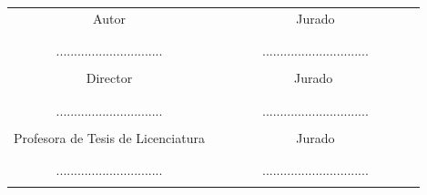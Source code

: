 \documentclass{article}
\numberwithin{figure}{section}
\begin{document}
\begin{center}
\begin{tabular}{|c|c|}
\hline
Autor &  \,\,\,\,\, \,\,\,\,\,\,\,\,\, \,\,\,\,\,\,\,\,\,\,\,\,\,\,\,\,\,\,Jurado \,\,\,\,\,\,\,\,\,\,\,\,\,\,\,\,\,\,\,\, \,\,\,\,\,\,\,\,\,\,\,\, \\
&            \\
       &            \\
  ..............................            &     ..............................          \\
       &            \\

\hline
Director &      \,\,\,\,\, \,\,\,\,\,\,\,\,\, \,\,\,\,\,\,\,\,\,\,\,\,\,\,\,\,\,\,Jurado \,\,\,\,\, \,\,\,\,\,\,\,\,\,\,\,\,\,\,\,\,\,\,\,\, \,\,\,\,\,\,\,\\
&            \\
       &            \\
  ..............................            &       ..............................        \\
         &            \\
 \hline
Profesora de Tesis de Licenciatura &  \,\,\,\,\,\,\, \,\,\,\,\, \,\,\,\,\,\,\,\,\,\,\,\,\,\,\,\,\,\,\,\,Jurado \,\,\,\,\,\,\,\,\,\,\,\,\,\,\,\,\,\,\,\,\,\,\,\,\,\,\, \,\,\,\,\,\\
&            \\
       &            \\
  ..............................            &      ..............................         \\
         &            \\
\hline
\end{tabular}
\end{center}














\renewcommand{\lstlistingname}{Código}
\end{document}
